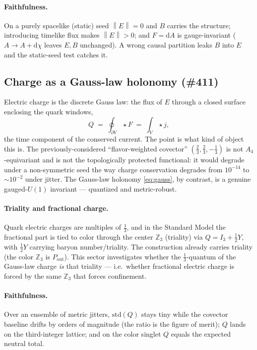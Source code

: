 \documentclass[11pt]{article}
\theoremstyle{definition}
\newcommand{\Z}{\mathbb{Z}}
\newcommand{\norm}[1]{\left\lVert #1 \right\rVert}
\newcommand{\Pout}{P_{\mathrm{out}}}
\newcommand{\dd}{\mathrm{d}}
\begin{document}
\paragraph{Faithfulness.} On a purely spacelike (static) seed $\norm{E}=0$ and $B$ carries
the structure; introducing timelike flux makes $\norm{E}>0$; and $F=\dd A$ is
gauge-invariant ($A\to A+\dd\chi$ leaves $E,B$ unchanged). A wrong causal partition leaks
$B$ into $E$ and the static-seed test catches it.

\subsection{Charge as a Gauss-law holonomy (\#411)}
\label{sec:gauss}

Electric charge is the discrete Gauss law: the flux of $E$ through a closed surface
enclosing the quark windows,
\begin{equation}
  Q \;=\; \oint_{\partial V} \star F \;=\; \int_V \star j ,
  \label{eq:gauss}
\end{equation}
the time component of the conserved current. The point is what kind of object this is.
The previously-considered ``flavor-weighted covector'' $(\tfrac23,\tfrac23,-\tfrac13)$ is
not $A_4$-equivariant and is not the topologically protected functional: it would degrade
under a non-symmetric seed the way charge conservation degrades from $10^{-14}$ to
$\sim10^{-2}$ under jitter. The Gauss-law holonomy \eqref{eq:gauss}, by contrast, is a
genuine gauged-$U(1)$ invariant --- quantized and metric-robust.

\paragraph{Triality and fractional charge.} Quark electric charges are multiples of
$\tfrac13$, and in the Standard Model the fractional part is tied to color through the
center $\Z_3$ (triality) via $Q=I_3+\tfrac12 Y$, with $\tfrac12 Y$ carrying baryon
number/triality. The construction already carries triality (the color $\Z_3$ is
$\Pout$). This sector investigates whether the $\tfrac13$-quantum of the Gauss-law charge
\emph{is} that triality --- i.e.\ whether fractional electric charge is forced by the
same $\Z_3$ that forces confinement.

\paragraph{Faithfulness.} Over an ensemble of metric jitters, $\mathrm{std}(Q)$ stays
tiny while the covector baseline drifts by orders of magnitude (the ratio is the figure
of merit); $Q$ lands on the third-integer lattice; and on the color singlet $Q$ equals
the expected neutral total.
\end{document}
